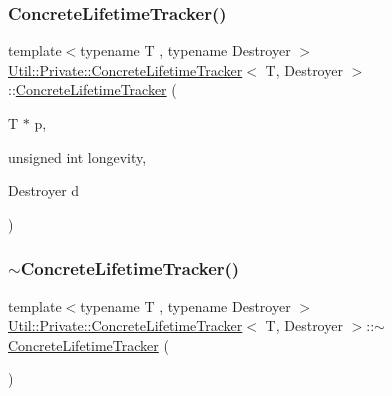 \subsubsection{\texorpdfstring{ConcreteLifetimeTracker()}{ConcreteLifetimeTracker()}\hspace{0.1cm}{\footnotesize\ttfamily [1/3]}}
{\footnotesize\ttfamily template$<$typename T , typename Destroyer $>$ \\
\mbox{\hyperlink{classUtil_1_1Private_1_1ConcreteLifetimeTracker}{Util\+::\+Private\+::\+Concrete\+Lifetime\+Tracker}}$<$ T, Destroyer $>$\+::\mbox{\hyperlink{classUtil_1_1Private_1_1ConcreteLifetimeTracker}{Concrete\+Lifetime\+Tracker}} (\begin{DoxyParamCaption}\item[{T $\ast$}]{p,  }\item[{unsigned int}]{longevity,  }\item[{Destroyer}]{d }\end{DoxyParamCaption})\hspace{0.3cm}{\ttfamily [inline]}}

\mbox{\label{classUtil_1_1Private_1_1ConcreteLifetimeTracker_a46aa326f024ef9d7301b84af803c5fb0}} 
\subsubsection{\texorpdfstring{$\sim$ConcreteLifetimeTracker()}{~ConcreteLifetimeTracker()}\hspace{0.1cm}{\footnotesize\ttfamily [1/3]}}
{\footnotesize\ttfamily template$<$typename T , typename Destroyer $>$ \\
\mbox{\hyperlink{classUtil_1_1Private_1_1ConcreteLifetimeTracker}{Util\+::\+Private\+::\+Concrete\+Lifetime\+Tracker}}$<$ T, Destroyer $>$\+::$\sim$\mbox{\hyperlink{classUtil_1_1Private_1_1ConcreteLifetimeTracker}{Concrete\+Lifetime\+Tracker}} (\begin{DoxyParamCaption}{ }\end{DoxyParamCaption})\hspace{0.3cm}{\ttfamily [inline]}}

